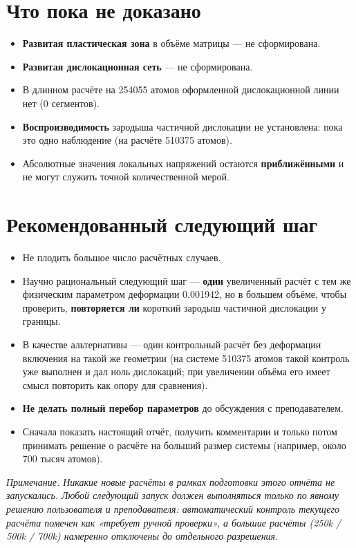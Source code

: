 \documentclass[12pt,a4paper]{extarticle}
\begin{document}
\section{Что пока не доказано}
\begin{itemize}[leftmargin=1.4em,itemsep=2pt,topsep=2pt]
\item \textbf{Развитая пластическая зона} в объёме матрицы — не сформирована.
\item \textbf{Развитая дислокационная сеть} — не сформирована.
\item В длинном расчёте на 254055 атомов оформленной дислокационной линии нет (0 сегментов).
\item \textbf{Воспроизводимость} зародыша частичной дислокации не установлена: пока это одно наблюдение (на расчёте 510375 атомов).
\item Абсолютные значения локальных напряжений остаются \textbf{приближёнными} и не могут служить точной количественной мерой.
\end{itemize}

\section{Рекомендованный следующий шаг}
\begin{itemize}[leftmargin=1.4em,itemsep=2pt,topsep=2pt]
\item Не плодить большое число расчётных случаев.
\item Научно рациональный следующий шаг — \textbf{один} увеличенный расчёт с тем же физическим параметром деформации 0.001942, но в большем объёме, чтобы проверить, \textbf{повторяется ли} короткий зародыш частичной дислокации у границы.
\item В качестве альтернативы — один контрольный расчёт без деформации включения на такой же геометрии (на системе 510375 атомов такой контроль уже выполнен и дал ноль дислокаций; при увеличении объёма его имеет смысл повторить как опору для сравнения).
\item \textbf{Не делать полный перебор параметров} до обсуждения с преподавателем.
\item Сначала показать настоящий отчёт, получить комментарии и только потом принимать решение о расчёте на больший размер системы (например, около 700 тысяч атомов).
\end{itemize}

\smallskip
\noindent\textit{Примечание. Никакие новые расчёты в рамках подготовки этого отчёта не запускались. Любой следующий запуск должен выполняться только по явному решению пользователя и преподавателя: автоматический контроль текущего расчёта помечен как «требует ручной проверки», а большие расчёты (250k / 500k / 700k) намеренно отключены до отдельного разрешения.}
\end{document}
